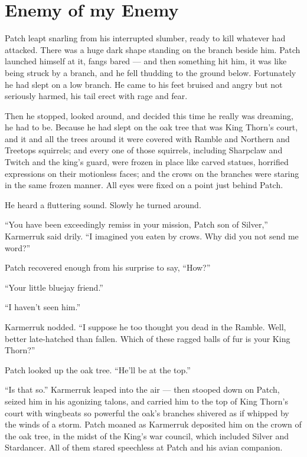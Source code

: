 \documentclass[ebook,oneside,openany,12pt]{memoir}
\begin{document}

\section{Enemy of my Enemy}

Patch leapt snarling from his interrupted slumber, ready to kill
whatever had attacked. There was a huge dark shape standing on the
branch beside him. Patch launched himself at it, fangs bared — and
then something hit him, it was like being struck by a branch, and he
fell thudding to the ground below. Fortunately he had slept on a low
branch. He came to his feet bruised and angry but not seriously
harmed, his tail erect with rage and fear.

Then he stopped, looked around, and decided this time he really was
dreaming, he had to be. Because he had slept on the oak tree that was
King Thorn’s court, and it and all the trees around it were covered
with Ramble and Northern and Treetops squirrels; and every one of
those squirrels, including Sharpclaw and Twitch and the king’s guard,
were frozen in place like carved statues, horrified expressions on
their motionless faces; and the crows on the branches were staring in
the same frozen manner. All eyes were fixed on a point just behind
Patch.

He heard a fluttering sound. Slowly he turned around.

“You have been exceedingly remiss in your mission, Patch son of
Silver,” Karmerruk said drily. “I imagined you eaten by crows. Why did
you not send me word?”

Patch recovered enough from his surprise to say, “How?”

“Your little bluejay friend.”

“I haven’t seen him.”

Karmerruk nodded. “I suppose he too thought you dead in the
Ramble. Well, better late-hatched than fallen. Which of these ragged
balls of fur is your King Thorn?”

Patch looked up the oak tree. “He’ll be at the top.”

“Is that so.” Karmerruk leaped into the air — then stooped down on
Patch, seized him in his agonizing talons, and carried him to the top
of King Thorn’s court with wingbeats so powerful the oak’s branches
shivered as if whipped by the winds of a storm. Patch moaned as
Karmerruk deposited him on the crown of the oak tree, in the midst of
the King’s war council, which included Silver and Stardancer. All of
them stared speechless at Patch and his avian companion.
\end{document}
